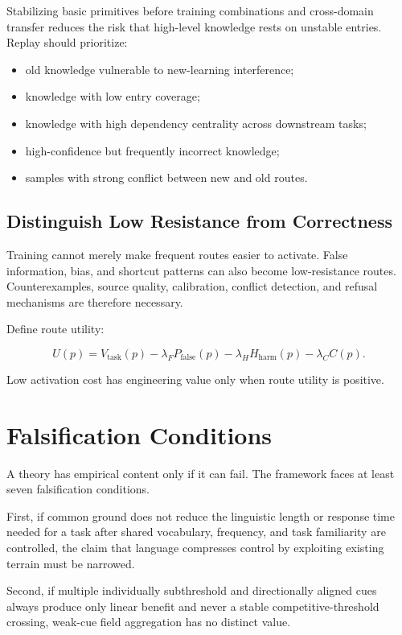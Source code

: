 \documentclass[11pt, a4paper]{article}
\begin{document}
Stabilizing basic primitives before training combinations and cross-domain transfer reduces the risk that high-level knowledge rests on unstable entries. Replay should prioritize:


\begin{itemize}
\item old knowledge vulnerable to new-learning interference;
\item knowledge with low entry coverage;
\item knowledge with high dependency centrality across downstream tasks;
\item high-confidence but frequently incorrect knowledge;
\item samples with strong conflict between new and old routes.
\end{itemize}


\subsection{Distinguish Low Resistance from Correctness}


Training cannot merely make frequent routes easier to activate. False information, bias, and shortcut patterns can also become low-resistance routes. Counterexamples, source quality, calibration, conflict detection, and refusal mechanisms are therefore necessary.


Define route utility:


\[
U(p)
=
V_{\text{task}}(p)
-\lambda_F P_{\text{false}}(p)
-\lambda_H H_{\text{harm}}(p)
-\lambda_C C(p).
\tag{22}
\]

Low activation cost has engineering value only when route utility is positive.



\section{Falsification Conditions}


A theory has empirical content only if it can fail. The framework faces at least seven falsification conditions.


First, if common ground does not reduce the linguistic length or response time needed for a task after shared vocabulary, frequency, and task familiarity are controlled, the claim that language compresses control by exploiting existing terrain must be narrowed.


Second, if multiple individually subthreshold and directionally aligned cues always produce only linear benefit and never a stable competitive-threshold crossing, weak-cue field aggregation has no distinct value.
\end{document}
